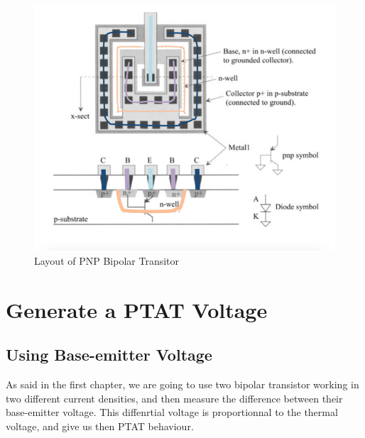 \documentclass[11pt,a4paper]{report}
\begin{document}
\begin{figure}[h]
  \begin{center}
    \includegraphics[scale=0.5]{photo/PNP_CMOS}
  \end{center}
  \caption{Layout of PNP Bipolar Transitor}
  \label{PNPCMOS}
\end{figure}

\chapter{Generate a PTAT Voltage}
\section{Using Base-emitter Voltage}

As said in the first chapter, we are going to use two bipolar transistor working in two different current densities, and then measure the difference between their base-emitter voltage. This diffenrtial voltage is proportionnal to the thermal voltage, and give us then PTAT behaviour.
\end{document}
